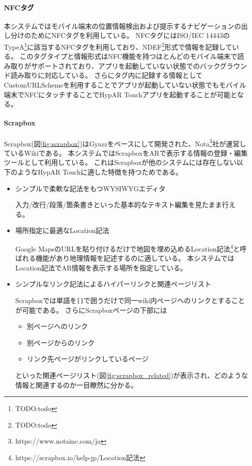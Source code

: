 \paragraph*{NFCタグ}
本システムではモバイル端末の位置情報検出および提示するナビゲーションの出し分けのためにNFCタグを利用している。
NFCタグにはISO/IEC 14443のTypeA\footnote{\textsf{TODO:todo}}に該当するNFCタグを利用しており、NDEF\footnote{\textsf{TODO:todo}}形式で情報を記録している。
このタグタイプと情報形式はNFC機能を持つほとんどのモバイル端末で読み取りがサポートされており、アプリを起動していない状態でのバックグラウンド読み取りに対応している。
さらにタグ内に記録する情報としてCustomURLSchemeを利用することでアプリが起動していない状態でもモバイル端末でNFCにタッチすることでHypAR Touchアプリを起動することが可能となる。

\paragraph*{Scrapbox}
Scrapbox(図\ref{fig:scrapbox})はGyazz\cite{Gyazz}をベースにして開発された、Nota\footnote{\textsf{https://www.notainc.com/ja}}社が運営しているWikiである。
本システムではScrapboxをARで表示する情報の登録・編集ツールとして利用している。
これはScrapboxが他のシステムには存在しない以下のようなHypAR Touchに適した特徴を持つためである。
\begin{itemize}
  \item シンプルで柔軟な記法をもつWYSIWYGエディタ
  
  入力/改行/段落/箇条書きといった基本的なテキスト編集を見たまま行える。
  
  \item 場所指定に最適なLocation記法
  
  Google MapsのURLを貼り付けるだけで地図を埋め込めるLocation記法\footnote{\textsf{https://scrapbox.io/help-jp/Location記法}}と呼ばれる機能があり地理情報を記述するのに適している。
  本システムではLocation記法でAR情報を表示する場所を指定している。

  \item シンプルなリンク記法によるハイパーリンクと関連ページリスト
  
  Scrapboxでは単語を\texttt{[]}で囲うだけで同一wiki内ページへのリンクとすることが可能である。
  さらにScrapboxページの下部には
  \begin{itemize}
      \item 別ページへのリンク
      \item 別ページからのリンク
      \item リンク先ページがリンクしているページ
  \end{itemize}
  といった関連ページリスト(図\ref{fig:scrapbox_related})が表示され、どのような情報と関連するのか一目瞭然に分かる。

\end{itemize}

